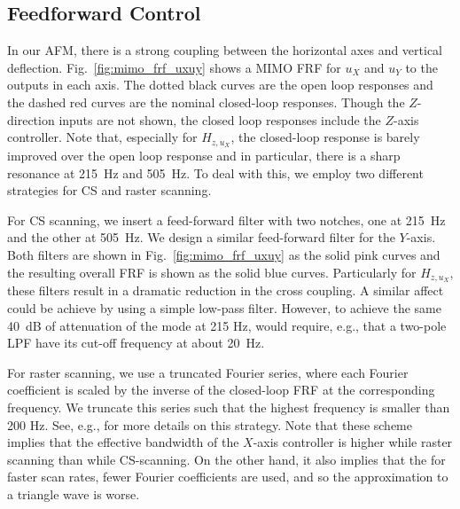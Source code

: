 \documentclass[twocolumn,oneside]{IEEEtran/IEEEtran}
\begin{document}

\subsection{Feedforward Control}\label{sec:ff_control}
In our AFM, there is a strong coupling between the horizontal axes and vertical deflection. Fig.~\ref{fig:mimo_frf_uxuy} shows a MIMO FRF for $u_X$ and $u_Y$ to the outputs in each axis. The dotted black curves are the open loop responses and the dashed red curves are the nominal closed-loop responses. Though the $Z$-direction inputs are not shown, the closed loop responses include the $Z$-axis controller. Note that, especially for $H_{z,u_X}$, the closed-loop response is barely improved over the open loop response and in particular, there is a sharp resonance at 215~Hz and 505~Hz. To deal with this, we employ two different strategies for CS and raster scanning.

For CS scanning, we insert a feed-forward filter with two notches, one at 215~Hz and the other at 505~Hz. We design a similar feed-forward filter for the $Y$-axis. Both filters are shown in Fig.~\ref{fig:mimo_frf_uxuy} as the solid pink curves and the resulting overall FRF is shown as the solid blue curves. Particularly for $H_{z,u_X}$, these filters result in a dramatic reduction in the cross coupling. A similar affect could be achieve by using a simple low-pass filter. However, to achieve the same 40~dB of attenuation of the mode at 215 Hz, would require, e.g., that a two-pole LPF have its cut-off frequency at about 20~Hz. 

For raster scanning, we use a truncated Fourier series, where each Fourier coefficient is scaled by the inverse of the closed-loop FRF at the corresponding frequency. We truncate this series such that the highest frequency is smaller than 200 Hz. See, e.g., \cite{clayton_review_2009} for more details on this strategy. Note that these scheme implies that the effective bandwidth of the $X$-axis controller is higher while raster scanning than while CS-scanning. On the other hand, it also implies that the for faster scan rates, fewer Fourier coefficients are used, and so the approximation to a triangle wave is worse.

\end{document}
